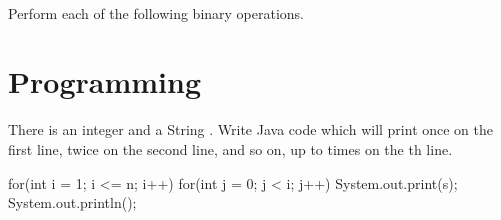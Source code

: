 \documentclass[answers,addpoints]{exam}
\begin{document}
\begin{questions}
\begin{parts}

    \begin{solution}
        \hfill\\
    \end{solution}
\end{parts}

\question Perform each of the following binary operations.

\section{Programming}

\question[15] There is an integer  and a String . Write Java code which will print  once on the first line, twice on the second line, and so on, up to  times on the th line.

\begin{solution}
\begin{code}
for(int i = 1; i <= n; i++) {
    for(int j = 0; j < i; j++) {
        System.out.print(s);
    }
    System.out.println();
}
\end{code}
\end{solution}


\end{questions}
\end{document}
